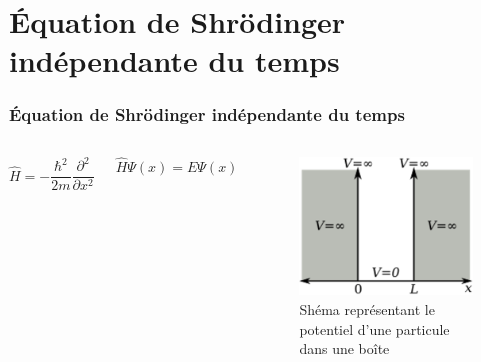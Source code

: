 \documentclass{beamer}
\begin{document}
\section{Équation de Shrödinger indépendante du temps}
\begin{frame}
\frametitle{Équation de Shrödinger indépendante du temps}

\begin{columns}

\begin{equation}\tag{3}
\hat{H}=-\frac{\hbar^2}{2m}\frac{\partial^2}{\partial x^2}
\end{equation} 

\begin{equation}\tag{4}
\hat{H}\Psi(x)=E\Psi(x)
\end{equation} 

\begin{figure}
\includegraphics[scale=0.4]{Pot}
\caption{Shéma représentant le potentiel d'une particule dans une boîte}
\end{figure}
\end{columns}

\end{frame}
\end{document}
